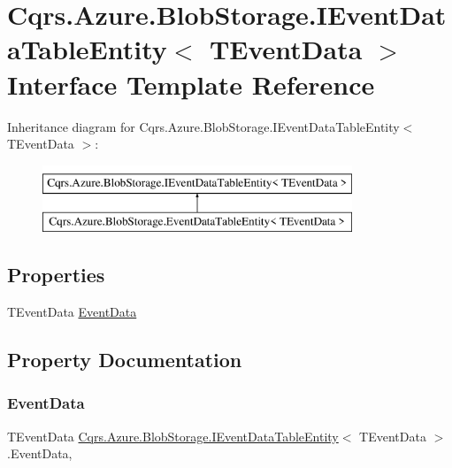 \hypertarget{interfaceCqrs_1_1Azure_1_1BlobStorage_1_1IEventDataTableEntity}{}\section{Cqrs.\+Azure.\+Blob\+Storage.\+I\+Event\+Data\+Table\+Entity$<$ T\+Event\+Data $>$ Interface Template Reference}
\label{interfaceCqrs_1_1Azure_1_1BlobStorage_1_1IEventDataTableEntity}
Inheritance diagram for Cqrs.\+Azure.\+Blob\+Storage.\+I\+Event\+Data\+Table\+Entity$<$ T\+Event\+Data $>$\+:\begin{figure}[H]
\begin{center}
\leavevmode
\includegraphics[height=2.000000cm]{interfaceCqrs_1_1Azure_1_1BlobStorage_1_1IEventDataTableEntity}
\end{center}
\end{figure}
\subsection*{Properties}
\begin{DoxyCompactItemize}
\item 
T\+Event\+Data \hyperlink{interfaceCqrs_1_1Azure_1_1BlobStorage_1_1IEventDataTableEntity_aa7b1f06172ce68c2cb2248be422edfe5_aa7b1f06172ce68c2cb2248be422edfe5}{Event\+Data}
\end{DoxyCompactItemize}


\subsection{Property Documentation}
\mbox{\label{interfaceCqrs_1_1Azure_1_1BlobStorage_1_1IEventDataTableEntity_aa7b1f06172ce68c2cb2248be422edfe5_aa7b1f06172ce68c2cb2248be422edfe5}} 
\subsubsection{\texorpdfstring{Event\+Data}{EventData}}
{\footnotesize\ttfamily T\+Event\+Data \hyperlink{interfaceCqrs_1_1Azure_1_1BlobStorage_1_1IEventDataTableEntity}{Cqrs.\+Azure.\+Blob\+Storage.\+I\+Event\+Data\+Table\+Entity}$<$ T\+Event\+Data $>$.Event\+Data\hspace{0.3cm}{\ttfamily [get]}, {\ttfamily [set]}}

